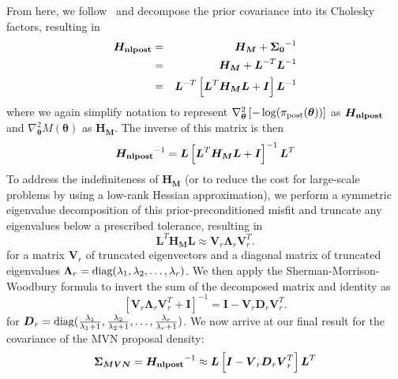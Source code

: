 From here, we follow~\cite{Petra2014} and decompose the prior covariance 
into its Cholesky factors, resulting in
\begin{eqnarray}
\boldsymbol{H_{\rm nlpost}} &=& \boldsymbol{H_M} + \boldsymbol{\Sigma_0}^{-1} \\
  &=& \boldsymbol{H_M} + \boldsymbol{L}^{-T}\boldsymbol{L}^{-1} \\
  &=& \boldsymbol{L}^{-T} \left[\boldsymbol{L}^T \boldsymbol{H_M} \boldsymbol{L}
    + \boldsymbol{I} \right] \boldsymbol{L}^{-1}
\end{eqnarray}
where we again simplify notation to represent $\nabla^2_{\boldsymbol{\theta}} 
  \left[ -\log(\pi_{\rm post}(\boldsymbol{\theta})) \right]$ as 
$\boldsymbol{H_{\rm nlpost}}$ and 
$\nabla^2_{\boldsymbol{\theta}} M(\boldsymbol{\theta})$ as $\boldsymbol{H_M}$.  
The inverse of this matrix is then
\begin{equation}
\boldsymbol{H_{\rm nlpost}}^{-1} = 
  \boldsymbol{L} \left[\boldsymbol{L}^T \boldsymbol{H_M} \boldsymbol{L} +
  \boldsymbol{I} \right]^{-1} \boldsymbol{L}^T
\label{eq:inv_hess_nlpost}
\end{equation}
To address the indefiniteness of $\boldsymbol{H_M}$ (or to reduce the
cost for large-scale problems by using a low-rank Hessian approximation), 
we perform a symmetric eigenvalue decomposition of this prior-preconditioned
misfit and truncate any eigenvalues below a prescribed tolerance, resulting in
\begin{equation}
\boldsymbol{L}^T \boldsymbol{H_M} \boldsymbol{L} \approx
\boldsymbol{V}_r \boldsymbol{\Lambda}_r \boldsymbol{V}_r^T.
\end{equation}
for a matrix $\boldsymbol{V}_r$ of truncated eigenvectors and a diagonal 
matrix of truncated eigenvalues 
$\boldsymbol{\Lambda}_r = {\rm diag}(\lambda_1, \lambda_2, \dots, \lambda_r)$.
We then apply the Sherman-Morrison-Woodbury formula to invert the sum of
the decomposed matrix and identity as
\begin{equation}
\left[\boldsymbol{V}_r \boldsymbol{\Lambda}_r \boldsymbol{V}_r^T +
  \boldsymbol{I} \right]^{-1} = \boldsymbol{I} - 
  \boldsymbol{V}_r \boldsymbol{D}_r \boldsymbol{V}_r^T.
\end{equation}
for $\boldsymbol{D}_r = {\rm diag}(\frac{\lambda_1}{\lambda_1+1}, \frac{\lambda_2}{\lambda_2+1}, \dots, \frac{\lambda_r}{\lambda_r+1})$.  We now arrive
at our final result for the covariance of the MVN proposal density:
\begin{equation}
\boldsymbol{\Sigma_{MVN}} = \boldsymbol{H_{\rm nlpost}}^{-1} \approx
  \boldsymbol{L} \left[ \boldsymbol{I} - 
  \boldsymbol{V}_r \boldsymbol{D}_r \boldsymbol{V}_r^T \right] \boldsymbol{L}^T
\label{eq:inv_hess_nlpost_approx}
\end{equation}


